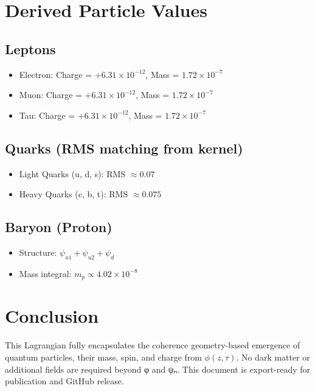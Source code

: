 \documentclass[12pt]{article}
\begin{document}
\section{Derived Particle Values}
\subsection*{Leptons}
\begin{itemize}
  \item Electron: Charge = $+6.31 \times 10^{-12}$, Mass = $1.72 \times 10^{-7}$
  \item Muon: Charge = $+6.31 \times 10^{-12}$, Mass = $1.72 \times 10^{-7}$
  \item Tau: Charge = $+6.31 \times 10^{-12}$, Mass = $1.72 \times 10^{-7}$
\end{itemize}

\subsection*{Quarks (RMS matching from kernel)}
\begin{itemize}
  \item Light Quarks (u, d, s): RMS $\approx 0.07$
  \item Heavy Quarks (c, b, t): RMS $\approx 0.075$
\end{itemize}

\subsection*{Baryon (Proton)}
\begin{itemize}
  \item Structure: $\psi_{u1} + \psi_{u2} + \psi_d$
  \item Mass integral: $m_p \propto 4.02 \times 10^{-8}$
\end{itemize}

\section{Conclusion}
This Lagrangian fully encapsulates the coherence geometry-based emergence of quantum particles, their mass, spin, and charge from \( \phi(z, \tau) \). No dark matter or additional fields are required beyond φ and ψₙ. This document is export-ready for publication and GitHub release.
\end{document}
